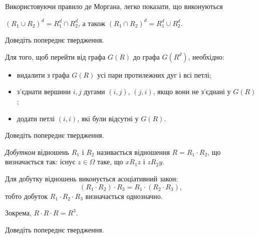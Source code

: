 Використовуючи правило де Моргана, легко показати, що виконуються
\begin{proposition}
	$(R_1 \cup R_2)^d = R_1^d \cap R_2^d$, а також $(R_1 \cap R_2)^d = R_1^d \cup R_2^d$.
\end{proposition}

\begin{exercise}
	Доведіть попереднє твердження.
\end{exercise}

\begin{proposition}
	Для того, щоб перейти від графа $G(R)$ до графа $G(R^d)$, необхідно:
	\begin{itemize}
		\item видалити з графа $G(R)$ усі пари протилежних дуг і всі петлі;
		\item з'єднати вершини $i, j$ дугами $(i, j)$, $(j, i)$, якщо вони не з'єднані у $G(R)$;
		\item додати петлі $(i, i)$, які були відсутні у $G(R)$.
	\end{itemize}
\end{proposition}

\begin{exercise}
	Доведіть попереднє твердження.
\end{exercise}

\begin{definition}
	\textit{Добутком} відношень $R_1$ і $R_2$ називається відношення $R = R_1 \cdot R_2$, що визначається так: існує $z \in \Omega$ таке, що $x R_1 z$ і $z R_2 y$.
\end{definition}

\begin{proposition}
	Для добутку відношень виконується асоціативний закон: \begin{equation}(R_1 \cdot R_2) \cdot R_3 = R_1 \cdot (R_2 \cdot R_3),\end{equation} тобто добуток $R_1 \cdot R_2 \cdot R_3$ визначається однозначно.
\end{proposition}

\begin{example}
	Зокрема, $R \cdot R \cdot R = R^3$.
\end{example}

\begin{exercise}
	Доведіть попереднє твердження.
\end{exercise}

